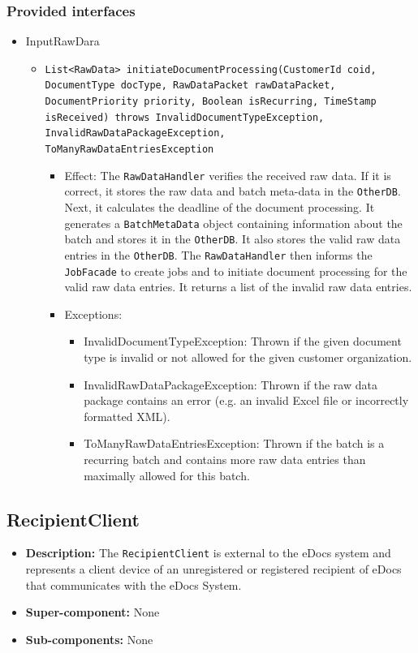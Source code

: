 \documentclass[a4paper,10pt]{article}
\begin{document}
\subsubsection*{Provided interfaces}
\begin{itemize}
    \item InputRawDara
    \begin{itemize}
        \item \texttt{List<RawData> initiateDocumentProcessing(CustomerId coid, DocumentType docType, RawDataPacket rawDataPacket, DocumentPriority priority, Boolean isRecurring, TimeStamp isReceived) throws InvalidDocumentTypeException, InvalidRawDataPackageException,\\ ToManyRawDataEntriesException}
        \begin{itemize}
            \item Effect: The \texttt{RawDataHandler} verifies the received raw data. If it is correct, it stores the raw data and batch meta-data in the \texttt{OtherDB}. Next, it calculates the deadline of the document processing. It generates a \texttt{BatchMetaData} object containing information about the batch and stores it in the \texttt{OtherDB}. It also stores the valid raw data entries in the \texttt{OtherDB}. The \texttt{RawDataHandler} then informs the \texttt{JobFacade} to create jobs and to initiate document processing for the valid raw data entries. It returns a list of the invalid raw data entries.
            \item Exceptions:
            \begin{itemize}
                \item InvalidDocumentTypeException: Thrown if the given document type is invalid or not allowed for the given customer organization.
            	\item InvalidRawDataPackageException: Thrown if the raw data package contains an error (e.g. an invalid Excel file or incorrectly formatted XML).
            	\item ToManyRawDataEntriesException: Thrown if the batch is a recurring batch and contains more raw data entries than maximally allowed for this batch.
            \end{itemize}
        \end{itemize}
    \end{itemize} 
\end{itemize}

\subsection{RecipientClient}
\begin{itemize}
    \item \textbf{Description:} The \texttt{RecipientClient} is external to the eDocs system and represents a client device of an unregistered or registered recipient of eDocs that communicates with the eDocs System.
    \item \textbf{Super-component:} None
    \item \textbf{Sub-components:} None
\end{itemize}
\end{document}
